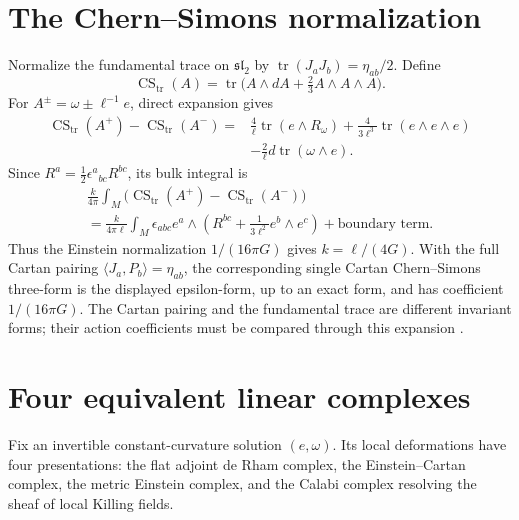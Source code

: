 \section{The Chern--Simons normalization}
Normalize the fundamental trace on $\mathfrak{sl}_2$ by
$\operatorname{tr}(J_aJ_b)=\eta_{ab}/2$. Define
\[
 \operatorname{CS}_{\operatorname{tr}}(A)
 =\operatorname{tr}\bigl(A\wedge dA+\tfrac23 A\wedge A\wedge A\bigr).
\]
For $A^\pm=\omega\pm\ell^{-1}e$, direct expansion gives
\[
\begin{split}
 \operatorname{CS}_{\operatorname{tr}}(A^+)
 -\operatorname{CS}_{\operatorname{tr}}(A^-)
 ={}&\frac4\ell\operatorname{tr}(e\wedge R_\omega)
 +\frac4{3\ell^3}\operatorname{tr}(e\wedge e\wedge e)\\
 &-\frac2\ell d\operatorname{tr}(\omega\wedge e).
\end{split}
\]
Since $R^a=\tfrac12\epsilon^a{}_{bc}R^{bc}$, its bulk integral is
\[
 \begin{gathered}
 \frac{k}{4\pi}\int_M
  \bigl(\operatorname{CS}_{\operatorname{tr}}(A^+)
       -\operatorname{CS}_{\operatorname{tr}}(A^-)\bigr)\\
 =\frac{k}{4\pi\ell}\int_M\epsilon_{abc}e^a\wedge
   \left(R^{bc}+\frac1{3\ell^2}e^b\wedge e^c\right)
   +\text{boundary term}.
 \end{gathered}
\]
Thus the Einstein normalization $1/(16\pi G)$ gives
$k=\ell/(4G)$. With the full Cartan pairing
$\langle J_a,P_b\rangle=\eta_{ab}$, the corresponding single Cartan
Chern--Simons three-form is the displayed epsilon-form, up to an exact
form, and has coefficient $1/(16\pi G)$. The Cartan pairing and the
fundamental trace are different invariant forms; their action coefficients
must be compared through this expansion \cite{AchucarroTownsend,Witten3DGravity}.

\section{Four equivalent linear complexes}
Fix an invertible constant-curvature solution $(e,\omega)$. Its local
deformations have four presentations: the flat adjoint de Rham complex,
the Einstein--Cartan complex, the metric Einstein complex, and the Calabi
complex resolving the sheaf of local Killing fields.

